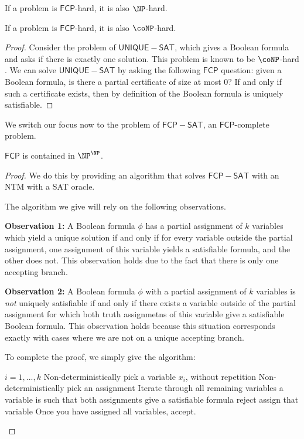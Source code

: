 \documentclass[runningheads,a4paper]{llncs}
\begin{document}
\begin{corollary}
If a problem is $\mathsf{FCP}$-hard, it is also $\NP$-hard.
\end{corollary}

\begin{proposition}
If a problem is $\mathsf{FCP}$-hard, it is also $\coNP$-hard. 
\end{proposition}

\begin{proof}
Consider the problem of $\mathsf{UNIQUE-SAT}$, which gives a Boolean formula and asks if there is exactly one solution. This problem is known to be $\coNP$-hard \cite{blass1982unique}. We can solve $\mathsf{UNIQUE-SAT}$ by asking the following $\mathsf{FCP}$ question: given a Boolean formula, is there a partial certificate of size at most 0? If and only if such a certificate exists, then by definition of the Boolean formula is uniquely satisfiable.
\end{proof}

We switch our focus now to the problem of $\mathsf{FCP-SAT}$, an $\mathsf{FCP}$-complete problem. 

\begin{proposition}
$\mathsf{FCP}$ is contained in $\NP^{\NP}$.
\end{proposition}

\begin{proof}
We do this by providing an algorithm that solves $\mathsf{FCP-SAT}$ with an NTM with a SAT oracle. 

The algorithm we give will rely on the following observations.

\textbf{Observation 1:} A Boolean formula $\phi$ has a partial assignment of $k$ variables which yield a unique solution if and only if for every variable outside the partial assignment, one assignment of this variable yields a satisfiable formula, and the other does not. This observation holds due to the fact that there is only one accepting branch.

\textbf{Observation 2:} A Boolean formula $\phi$ with a partial assignment of $k$ variables is \emph{not} uniquely satisfiable if and only if there exists a variable outside of the partial assignment for which both truth assignmetns of this variable give a satisfiable Boolean formula. This observation holds because this situation corresponds exactly with cases where we are not on a unique accepting branch.

To complete the proof, we simply give the algorithm:

\begin{codebox}
\li \For $i = 1, ..., k$ \Then
\li Non-deterministically pick a variable $x_i$, without repetition
\li Non-deterministically pick an assignment \End
\li Iterate through all remaining variables \Then
\li \If a variable is such that both assignments give a satisfiable formula \Then
\li reject
\li \Else assign that variable \End \End
\li Once you have assigned all variables, accept.
\end{codebox}
\end{proof}
\end{document}
